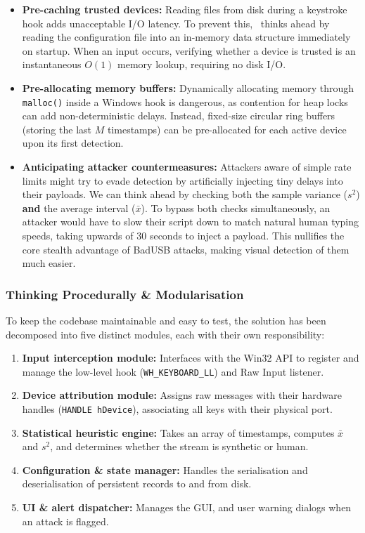 \begin{itemize}
	\item \textbf{Pre-caching trusted devices:} Reading files from disk during a keystroke hook adds unacceptable I/O latency. To prevent this, \projectNameFormatted\ thinks ahead by reading the configuration file into an in-memory data structure immediately on startup. When an input occurs, verifying whether a device is trusted is an instantaneous $O(1)$ memory lookup, requiring no disk I/O.
	\item \textbf{Pre-allocating memory buffers:} Dynamically allocating memory through \texttt{malloc()} inside a Windows hook is dangerous, as contention for heap locks can add non-deterministic delays. Instead, fixed-size circular ring buffers (storing the last $M$ timestamps) can be pre-allocated for each active device upon its first detection.
	\item \textbf{Anticipating attacker countermeasures:} Attackers aware of simple rate limits might try to evade detection by artificially injecting tiny delays into their payloads. We can think ahead by checking both the sample variance ($s^2$) \textbf{and} the average interval ($\bar{x}$). To bypass both checks simultaneously, an attacker would have to slow their script down to match natural human typing speeds, taking upwards of 30 seconds to inject a payload. This nullifies the core stealth advantage of BadUSB attacks, making visual detection of them much easier.
\end{itemize}

\subsubsection{Thinking Procedurally \& Modularisation}

To keep the codebase maintainable and easy to test, the solution has been decomposed into five distinct modules, each with their own responsibility:

\begin{enumerate}
	\item \textbf{Input interception module:} Interfaces with the Win32 API to register and manage the low-level hook (\texttt{WH\_KEYBOARD\_LL}) and Raw Input listener.
	\item \textbf{Device attribution module:} Assigns raw messages with their hardware handles (\texttt{HANDLE hDevice}), associating all keys with their physical port.
	\item \textbf{Statistical heuristic engine:} Takes an array of timestamps, computes $\bar{x}$ and $s^2$, and determines whether the stream is synthetic or human.
	\item \textbf{Configuration \& state manager:} Handles the serialisation and deserialisation of persistent records to and from disk.
	\item \textbf{UI \& alert dispatcher:} Manages the GUI, and user warning dialogs when an attack is flagged.
\end{enumerate}

